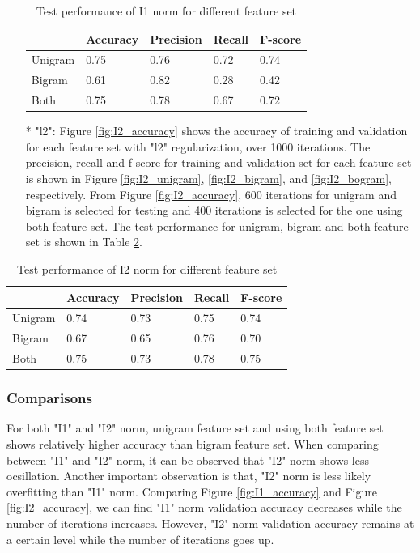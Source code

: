 \documentclass[11pt]{article}
\begin{document}
\begin{itemize}
\begin{table}[]
\centering
\caption{Test performance of I1 norm for different feature set}
\label{I1_test}
\begin{tabular}{lllll}
\hline
        & Accuracy & Precision & Recall & F-score \\ \hline
Unigram & 0.75     & 0.76      & 0.72   & 0.74    \\ \hline
Bigram  & 0.61     & 0.82      & 0.28   & 0.42    \\ \hline
Both    & 0.75     & 0.78      & 0.67   & 0.72    \\ \hline
\end{tabular}
\end{table}

\item[*] "l2": Figure \ref{fig:I2_accuracy} shows the accuracy of training and validation for each feature set with "l2" regularization, over 1000 iterations. The precision, recall and f-score for training and validation set for each feature set is shown in Figure \ref{fig:I2_unigram}, \ref{fig:I2_bigram}, and \ref{fig:I2_bogram}, respectively. From Figure \ref{fig:I2_accuracy}, 600 iterations for unigram and bigram is selected for testing and 400 iterations is selected for the one using both feature set. The test performance for unigram, bigram and both feature set is shown in Table \ref{I2_test}.
\end{itemize}

\begin{table}[]
\centering
\caption{Test performance of I2 norm for different feature set}
\label{I2_test}
\begin{tabular}{lllll}
\hline
        & Accuracy & Precision & Recall & F-score \\ \hline
Unigram & 0.74     & 0.73      & 0.75   & 0.74    \\ \hline
Bigram  & 0.67     & 0.65      & 0.76   & 0.70    \\ \hline
Both    & 0.75     & 0.73      & 0.78   & 0.75    \\ \hline
\end{tabular}
\end{table}

\subsubsection{Comparisons}
For both "I1" and "I2" norm, unigram feature set and using both feature set shows relatively higher accuracy than bigram feature set. When comparing between "I1" and "I2" norm, it can be observed that "I2" norm shows less ocsillation. Another important observation is that, "I2" norm is less likely overfitting than "I1" norm. Comparing Figure \ref{fig:I1_accuracy} and Figure \ref{fig:I2_accuracy}, we can find "I1" norm validation accuracy decreases while the number of iterations increases. However, "I2" norm validation accuracy remains at a certain level while the number of iterations goes up.
\end{document}
